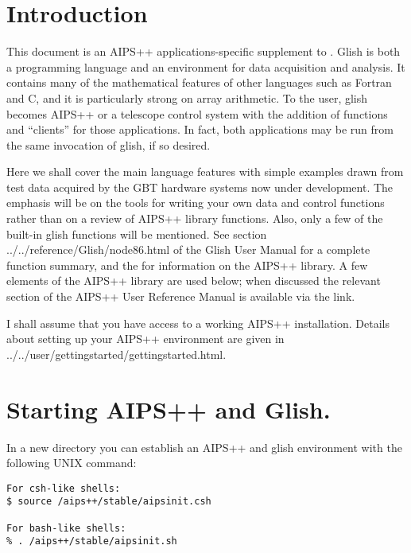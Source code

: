 

\section{Introduction} 

This document is an AIPS++ applications-specific supplement to
.  Glish is both a
programming language and an environment for data acquisition and
analysis.  It contains many of the mathematical features of other
languages such as Fortran and C, and it is particularly strong on
array arithmetic.  To the user, glish becomes AIPS++ or a telescope
control system with the addition of functions and ``clients'' for those
applications.  In fact, both applications may be run from the same
invocation of glish, if so desired.

Here we shall cover the main language features with simple examples
drawn from test data acquired by the GBT hardware systems now under
development.  The emphasis will be on the tools for writing your own
data and control functions rather than on a review of AIPS++ library
functions.  Also, only a few of the built-in glish functions will be
mentioned.  See section 
{../../reference/Glish/node86.html} of the Glish User Manual for a
complete function summary, and the  for information on the
AIPS++ library. A few elements of the AIPS++ library are used
below; when discussed the relevant section of the AIPS++ User
Reference Manual is available via the link.

I shall assume that you have access to a working AIPS++ installation.
Details about setting up your AIPS++ environment are given in 
{../../user/gettingstarted/gettingstarted.html}.

\section{Starting AIPS++ and Glish.}

    In a new directory you can establish an AIPS++ and glish environment
with the following UNIX command:

\begin{verbatim}
For csh-like shells:
$ source /aips++/stable/aipsinit.csh

For bash-like shells:
% . /aips++/stable/aipsinit.sh
\end{verbatim}

